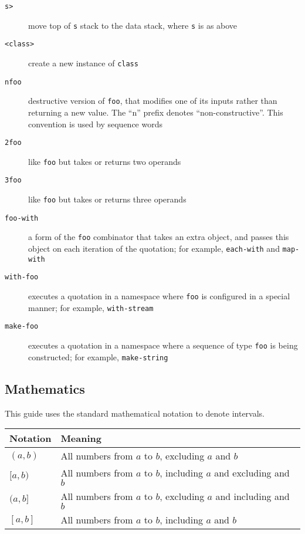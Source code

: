 \documentclass{book}
\begin{document}
\begin{description}
\item[\texttt{s>}] move top of \texttt{s} stack to the data stack, where \texttt{s} is as above
\item[\texttt{<class>}] create a new instance of \texttt{class}
\item[\texttt{nfoo}] destructive version of \texttt{foo}, that modifies one of its inputs rather than returning a new value. The ``n'' prefix denotes ``non-constructive''. This convention is used by sequence words
\item[\texttt{2foo}] like \texttt{foo} but takes or returns two operands
\item[\texttt{3foo}] like \texttt{foo} but takes or returns three operands
\item[\texttt{foo-with}] a form of the \texttt{foo} combinator that takes an extra object, and passes this object on each iteration of the quotation; for example, \texttt{each-with} and \texttt{map-with}
\item[\texttt{with-foo}] executes a quotation in a namespace where \texttt{foo} is configured in a special manner; for example, \texttt{with-stream}
\item[\texttt{make-foo}] executes a quotation in a namespace where a sequence of type \texttt{foo} is being constructed; for example, \texttt{make-string}
\end{description}

\subsection{Mathematics}

This guide uses the standard mathematical notation to denote intervals.

\begin{tabular}{l|l}
Notation&Meaning\\
\hline
$(a,b)$&All numbers from $a$ to $b$, excluding $a$ and $b$\\
$[a,b)$&All numbers from $a$ to $b$, including $a$ and excluding and $b$\\
$(a,b]$&All numbers from $a$ to $b$, excluding $a$ and including and $b$\\
$[a,b]$&All numbers from $a$ to $b$, including $a$ and $b$
\end{tabular}
\end{document}
